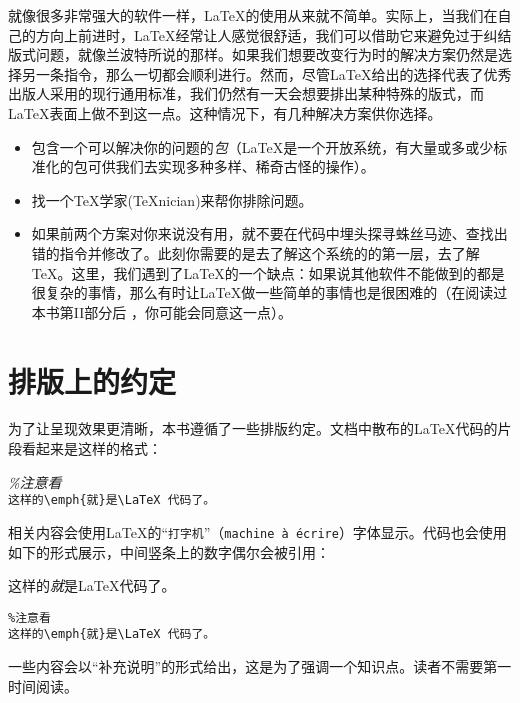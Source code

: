 就像很多非常强大的软件一样，\LaTeX 的使用从来就不简单。实际上，当我们在自己的方向上前进时，\LaTeX 经常让人感觉很舒适，我们可以借助它来避免过于纠结版式问题，就像兰波特所说的那样。如果我们想要改变行为时的解决方案仍然是选择另一条指令，那么一切都会顺利进行。然而，尽管\LaTeX 给出的选择代表了优秀出版人采用的现行通用标准，我们仍然有一天会想要排出某种特殊的版式，而\LaTeX 表面上做不到这一点。这种情况下，有几种解决方案供你选择。
\begin{itemize}
    \item 包含一个可以解决你的问题的\emph{包}（\LaTeX 是一个开放系统，有大量或多或少标准化的包可供我们去实现多种多样、稀奇古怪的操作）。
    \item 找一个\TeX 学家(\TeX nician)来帮你排除问题。
    \item 如果前两个方案对你来说没有用，就不要在代码中埋头探寻蛛丝马迹、查找出错的指令并修改了。此刻你需要的是去了解这个系统的的第一层，去了解\TeX 。这里，我们遇到了\LaTeX 的一个缺点：如果说其他软件不能做到的都是很复杂的事情，那么有时让\LaTeX 做一些简单的事情也是很困难的（在阅读过本书第II部分后%
    ，你可能会同意这一点）。
\end{itemize}

\section*{排版上的约定}

为了让呈现效果更清晰，本书遵循了一些排版约定。文档中散布的\LaTeX 代码的片段看起来是这样的格式：

\begin{dmd}
\textsl{\%注意看}\\
\verb+这样的\emph{就}是\LaTeX 代码了。+
\end{dmd}

相关内容会使用\LaTeX 的“\texttt{打字机}”（\texttt{machine à écrire}）字体显示。代码也会使用如下的形式展示，中间竖条上的数字偶尔会被引用：%

\begin{codelist}[0.1]{
    这样的\emph{就}是\LaTeX 代码了。
}
\begin{verbatim}
%注意看
这样的\emph{就}是\LaTeX 代码了。\end{verbatim}
\end{codelist}

\begin{ii}
一些内容会以“补充说明”的形式给出，这是为了强调一个知识点。读者不需要第一时间阅读。
\end{ii}

